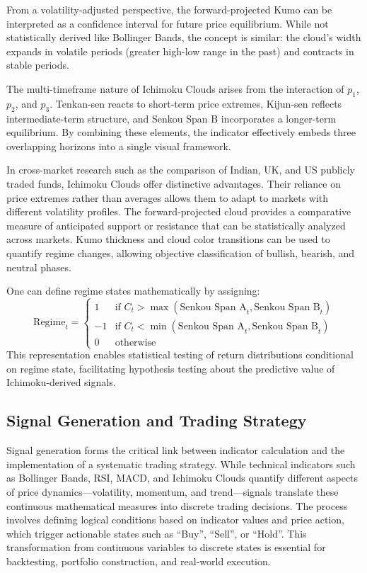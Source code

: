 From a volatility-adjusted perspective, the forward-projected Kumo can be interpreted as a confidence interval for future price equilibrium. While not statistically derived like Bollinger Bands, the concept is similar: the cloud's width expands in volatile periods (greater high-low range in the past) and contracts in stable periods.

The multi-timeframe nature of Ichimoku Clouds arises from the interaction of $p_1$, $p_2$, and $p_3$. Tenkan-sen reacts to short-term price extremes, Kijun-sen reflects intermediate-term structure, and Senkou Span B incorporates a longer-term equilibrium. By combining these elements, the indicator effectively embeds three overlapping horizons into a single visual framework.

In cross-market research such as the comparison of Indian, UK, and US publicly traded funds, Ichimoku Clouds offer distinctive advantages. Their reliance on price extremes rather than averages allows them to adapt to markets with different volatility profiles. The forward-projected cloud provides a comparative measure of anticipated support or resistance that can be statistically analyzed across markets. Kumo thickness and cloud color transitions can be used to quantify regime changes, allowing objective classification of bullish, bearish, and neutral phases.

One can define regime states mathematically by assigning:
\[
\text{Regime}_t =
\begin{cases}
1 & \text{if } C_t > \max(\text{Senkou Span A}_t, \text{Senkou Span B}_t) \\
-1 & \text{if } C_t < \min(\text{Senkou Span A}_t, \text{Senkou Span B}_t) \\
0 & \text{otherwise}
\end{cases}
\]
This representation enables statistical testing of return distributions conditional on regime state, facilitating hypothesis testing about the predictive value of Ichimoku-derived signals.

\subsection{Signal Generation and Trading Strategy}

Signal generation forms the critical link between indicator calculation and the implementation of a systematic trading strategy. While technical indicators such as Bollinger Bands, RSI, MACD, and Ichimoku Clouds quantify different aspects of price dynamics—volatility, momentum, and trend—signals translate these continuous mathematical measures into discrete trading decisions. The process involves defining logical conditions based on indicator values and price action, which trigger actionable states such as ``Buy'', ``Sell'', or ``Hold''. This transformation from continuous variables to discrete states is essential for backtesting, portfolio construction, and real-world execution.

